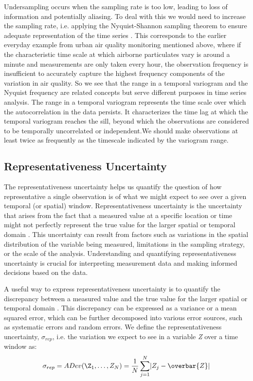 \documentclass[sensors,article,submit,moreauthors,pdftex]{Definitions/mdpi}
\begin{document}
Undersampling occurs when the sampling rate is too low, leading to loss of information and potentially aliasing. To deal with this we would need to increase the sampling rate, i.e. applying the Nyquist-Shannon sampling theorem to ensure adequate representation of the time series \citep{oppenheim1999discrete}. This corresponds to the earlier everyday example from urban air quality monitoring mentioned above, where if the characteristic time scale at which airborne particulates vary is around a minute and measurements are only taken every hour, the observation frequency is insufficient to accurately capture the highest frequency components of the variation in air quality. So we see that the range in a temporal variogram and the Nyquist frequency are related concepts but serve different purposes in time series analysis. The range in a temporal variogram represents the time scale over which the autocorrelation in the data persists. It characterizes the time lag at which the temporal variogram reaches the sill, beyond which the observations are considered to be temporally uncorrelated or independent.We should make observations at least twice as frequently as the timescale indicated by the variogram range.

\subsection{Representativeness Uncertainty}

The representativeness uncertainty helps us quantify the question of how representative a single observation is of what we might expect to see over a given temporal (or spatial) window. Representativeness uncertainty is the uncertainty that arises from the fact that a measured value at a specific location or time might not perfectly represent the true value for the larger spatial or temporal domain \citep{Lary2003, foken2006review, risbey2005framework, mckendry2002representativeness, helbig2010representativeness}. This uncertainty can result from factors such as variations in the spatial distribution of the variable being measured, limitations in the sampling strategy, or the scale of the analysis. Understanding and quantifying representativeness uncertainty is crucial for interpreting measurement data and making informed decisions based on the data. 

A useful way to express representativeness uncertainty is to quantify the discrepancy between a measured value and the true value for the larger spatial or temporal domain \citep{Lary2003, draxler2004uncertainty, schindlbacher2008spatial, mcMillan2012hydrological, gao2016estimation}. This discrepancy can be expressed as a variance or a mean squared error, which can be further decomposed into various error sources, such as systematic errors and random errors. We define the representativeness uncertainty, $\sigma_{rep}$, i.e. the variation we expect to see in a variable \textit{Z} over a time window as:
\begin{equation}
    \sigma_{rep} = ADev(\Z_1, \ldots, Z_N) = \frac{1}{N}\sum_{j=1}^N \lvert Z_j-\overbar{Z} \rvert
\end{equation}
\end{document}
